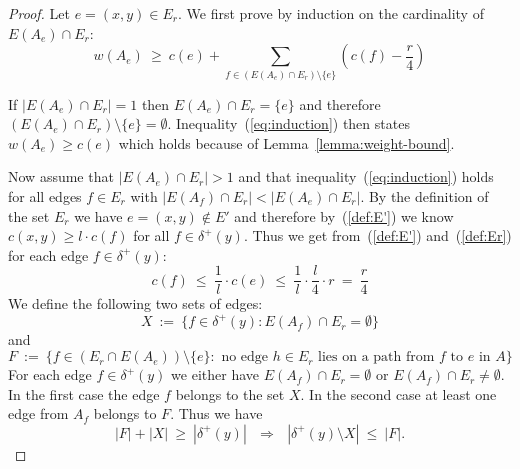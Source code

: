 \documentclass[a4paper, 11pt]{article}
\begin{document}
\begin{proof}
Let $e = (x,y) \in E_r$. We first prove by induction on the cardinality of $E(A_e) \cap E_r$: 
\begin{equation}
w(A_e) ~\ge ~ c(e) + \sum_{f\in \left(E(A_e) \cap E_r\right) \setminus \{e\}} \left ( c(f) - \frac{r}{4}\right)
\label{eq:induction}
\end{equation}
 
If $|E(A_e) \cap E_r| = 1$ then $E(A_e) \cap E_r = \{e\}$ and therefore $(E(A_e) \cap E_r) \setminus \{e\} = \emptyset$.
Inequality~(\ref{eq:induction}) then states $w(A_e) \ge  c(e)$ which holds because of Lemma~\ref{lemma:weight-bound}.

Now assume that $|E(A_e) \cap E_r| > 1$ and that inequality~(\ref{eq:induction}) holds for all edges $f \in E_r$ with $|E(A_f) \cap E_r| < |E(A_e) \cap E_r|$. 
By the definition of the set $E_r$ we have $e=(x,y) \not\in E'$ and therefore by~(\ref{def:E'}) we know 
$c(x,y) \ge l \cdot c(f)$ for all $f\in\delta^+(y)$. Thus we get from~(\ref{def:E'}) and~(\ref{def:Er}) for each edge $f\in \delta^+(y)$: 
\begin{equation}
c(f) ~\le ~ \frac{1}{l}\cdot c(e)  ~\le~ \frac{1}{l}\cdot \frac{l}{4} \cdot r ~=~  \frac{r}{4}
\label{eq:r/4-bound}
\end{equation}
We define the following two sets of edges: 
\begin{equation*}
X ~ := ~ \{f\in \delta^+(y): E(A_f) \cap E_r = \emptyset\}
\end{equation*}
and
\begin{equation*}
F ~ := ~ \{f\in (E_r\cap E(A_e)) \setminus \{e\}: \mbox{ no edge } h\in E_r \mbox{ lies on a path from $f$ to $e$ in $A$} \}
\end{equation*}
For each edge $f\in \delta^+(y)$ we either have $E(A_f) \cap E_r = \emptyset$ or $E(A_f) \cap E_r \not= \emptyset$. In the first case the edge $f$ belongs to 
the set $X$.
In the second case at least one edge from $A_f$ belongs to $F$. Thus we have
\begin{equation}
|F| + |X| ~\ge~ |\delta^+(y)| ~~~\Rightarrow ~~~ |\delta^+(y) \setminus X| ~\le~ |F|. 
\label{eq:setsizes}
\end{equation}
 

\end{proof}
\end{document}
